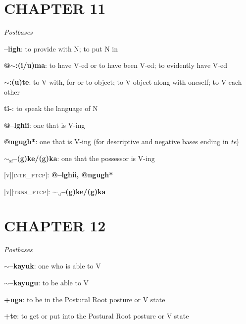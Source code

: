 \documentclass{article}
\begin{document}
\section{CHAPTER 11}

\textit{Postbases}
\begin{description}
\item \textbf{--ligh}: to provide with N; to put N in
\item \textbf{@$\sim$:(i/u)ma}: to have V-ed or to have been V-ed; to evidently have V-ed
\item \textbf{$\sim$:(u)te}: to V with, for or to object; to V object along with oneself; to V each other
\item \textbf{ti-}: to speak the language of N
\item \textbf{@--lghii}: one that is V-ing
\item \textbf{@ngugh*}: one that is V-ing (for descriptive and negative bases ending in \textit{te})
\item \textbf{$\sim_\text{sf}$--(g)ke/(g)ka}: one that the possessor is V-ing
\end{description}

\bigskip

\textsc{[v][intr\_ptcp]}: \textbf{@--lghii, @ngugh*}

\textsc{[v][trns\_ptcp]}: \textbf{$\sim_\text{sf}$--(g)ke/(g)ka}

\section{CHAPTER 12}

\textit{Postbases}
\begin{description}
\item \textbf{$\sim$--kayuk}: one who is able to V
\item \textbf{$\sim$--kayugu}: to be able to V
\item \textbf{+nga}: to be in the Postural Root posture or V state
\item \textbf{+te}: to get or put into the Postural Root posture or V state
\end{description}
\end{document}
